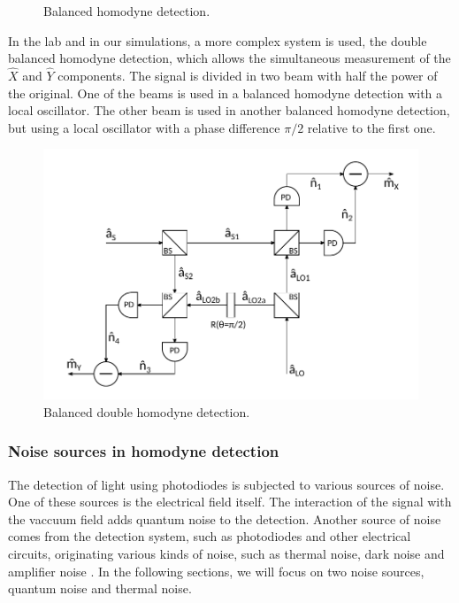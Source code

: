 \begin{bibunit}[plain]
\begin{figure}[H]
	\caption{Balanced homodyne detection.}
\end{figure}
%
In the lab and in our simulations, a more complex system is used, the double balanced homodyne detection, which allows the simultaneous measurement of the $\hat{X}$ and $\hat{Y}$ components. The signal is divided in two beam with half the power of the original. One of the beams is used in a balanced homodyne detection with a local oscillator. The other beam is used in another balanced homodyne detection, but using a local oscillator with a phase difference $\pi/2$ relative to the first one.
%
\begin{figure}[H]
	\label{fig:scheme_homodyne}
	\centering
	\includegraphics{./sdf/optical_detection/figures/scheme_double_homodyne.pdf}
	\caption{Balanced double homodyne detection.}
\end{figure}
%
%
%
\subsubsection{Noise sources in homodyne detection}
The detection of light using photodiodes is subjected to various sources of noise. One of these sources is the electrical field itself. The interaction of the signal with the vaccuum field adds quantum noise to the detection.
Another source of noise comes from the detection system, such as photodiodes and other electrical circuits, originating various kinds of noise, such as thermal noise, dark noise and amplifier noise
\cite{hans2004}.
In the following sections, we will focus on two noise sources, quantum noise and thermal noise.
%
%
%

\end{bibunit}

